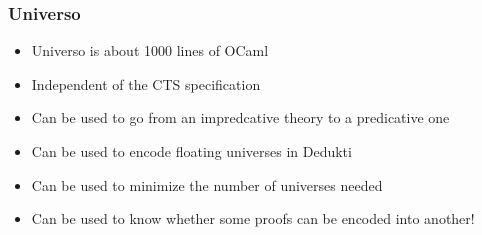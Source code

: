 \documentclass[usenames, dvipsnames]{beamer}
\newcommand{\orange}[1]{\textcolor{BurntOrange}{#1}}
\newcommand{\blue}[1]{\textcolor{NavyBlue}{#1}}
\begin{document}
\begin{frame}
  \frametitle{Universo}

  \begin{itemize}
  \item \blue{Universo} is about 1000 lines of OCaml
  \item \orange{Independent} of the CTS specification
  \item Can be used to go from an \blue{impredcative theory} to a predicative
    one
  \item Can be used to encode \blue{floating universes} in Dedukti
  \item Can be used to \blue{minimize} the number of universes needed
  \item Can be used to know whether some \blue{proofs} can \blue{be encoded} into another!
  \end{itemize}
\end{frame}
\end{document}
